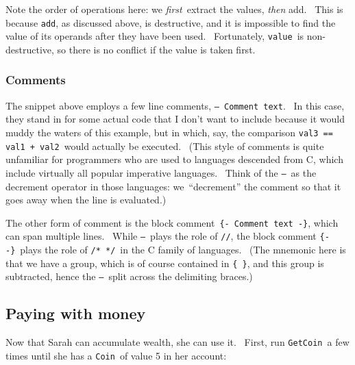 \documentclass[11pt]{article}
\begin{document}
Note the order of operations here: we \textit{first} extract the values, \textit{then }add.  This is because \texttt{add}, as discussed above, is destructive, and it is impossible to find the value of its operands after they have been used.  Fortunately, \texttt{value} is non-destructive, so there is no conflict if the value is taken first.

\subsubsection{Comments}
\vspace{5.5pt}

The snippet above employs a few line comments, \texttt{-- Comment text}.  In this case, they stand in for some actual code that I don't want to include because it would muddy the waters of this example, but in which, say, the comparison \texttt{val3 == val1 + val2} would actually be executed.  (This style of comments is quite unfamiliar for programmers who are used to languages descended from C, which include virtually all popular imperative languages.  Think of the \texttt{--} as the decrement operator in those languages: we “decrement” the comment so that it goes away when the line is evaluated.)


\vspace{11pt}

The other form of comment is the block comment \texttt{\{- Comment text -\}}, which can span multiple lines.  While \texttt{--} plays the role of \texttt{\slash{}\slash{}}, the block comment \texttt{\{- -\}} plays the role of \texttt{\slash{}* *\slash{}} in the C family of languages.  (The mnemonic here is that we have a group, which is of course contained in \texttt{\{ \}}, and this group is subtracted, hence the \texttt{--} split across the delimiting braces.)

\subsection{Paying with money}
\vspace{5.5pt}

Now that Sarah can accumulate wealth, she can use it.  First, run \texttt{GetCoin} a few times until she has a \texttt{Coin} of value 5 in her account:


\vspace{11pt}
\end{document}
